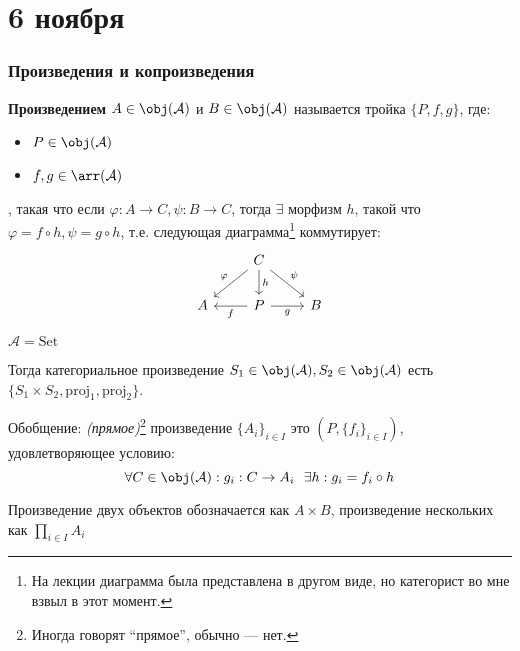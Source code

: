 \chapter{6 ноября}

\subsection{Произведения и копроизведения}

\begin{definition}
    \textbf{Произведением} \(A \in \obj(\mathcal{A})\) и \(B \in \obj(\mathcal{A})\) называется тройка \(\{P, f, g\}\), где:
    \begin{itemize}
        \item \(P \in \obj(\mathcal{A})\)
        \item \(f, g \in \arr(\mathcal{A})\)
    \end{itemize}
    , такая что если \(\varphi : A \to C, \psi : B \to C\), тогда \(\exists\) морфизм \(h\), такой что \(\varphi = f \circ h, \psi = g \circ h\), т.е. следующая диаграмма\footnote{На лекции диаграмма была представлена в другом виде, но категорист во мне взвыл в этот момент.} коммутирует:
    \[\begin{tikzcd}
            & \arrow[swap]{dl}{\varphi} C \arrow{d}{h} \arrow{dr}{\psi} & \\
            A & \arrow{l}{f} P \arrow[swap]{r}{g} & B
        \end{tikzcd}\]
\end{definition}

\begin{example}
    \(\mathcal{A} = \mathrm{Set}\)

    Тогда категориальное произведение \(S_1 \in \obj(\mathcal{A}), S_2 \in \obj(\mathcal{A})\) есть \(\{S_1 \times S_2, \mathrm{proj}_1, \mathrm{proj}_2\}\).
\end{example}

Обобщение: \textit{(прямое)}\footnote{Иногда говорят ``прямое'', обычно --- нет.} произведение \(\{A_i\}_{i \in I}\) это \((P, \{f_i\}_{i \in I})\), удовлетворяющее условию:
\[\forall C \in \obj(\mathcal{A}) : g_i : C \to A_i \ \ \exists h : g_i = f_i \circ h\]

\begin{remark}
    Произведение двух объектов обозначается как \(A \times B\), произведение нескольких как \(\prod\limits_{i \in I} A_i\)
\end{remark}

